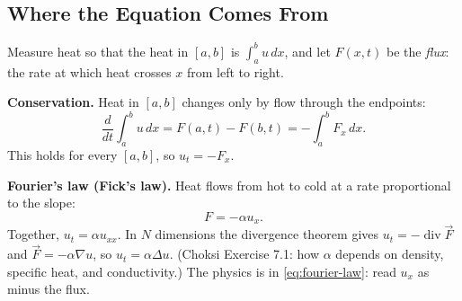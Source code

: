 \documentclass{article}
\begin{document}
\subsection{Where the Equation Comes From}
Measure heat so that the heat in $[a,b]$ is $\int_a^b u\,dx$, and let $F(x,t)$ be the \emph{flux}: the rate at which heat crosses $x$ from left to right.\par
\textbf{Conservation.} Heat in $[a,b]$ changes only by flow through the endpoints:
\begin{equation}
    \frac{d}{dt}\int_a^b u\,dx = F(a,t) - F(b,t) = -\int_a^b F_x\,dx.
\end{equation}
This holds for every $[a,b]$, so $u_t = -F_x$.\par
\textbf{Fourier's law (Fick's law).} Heat flows from hot to cold at a rate proportional to the slope:
\begin{equation}\label{eq:fourier-law}
    F = -\alpha u_x.
\end{equation}
Together, $u_t = \alpha u_{xx}$. In $N$ dimensions the divergence theorem gives $u_t = -\operatorname{div}\vec{F}$ and $\vec{F} = -\alpha\nabla u$, so $u_t = \alpha\Delta u$. (Choksi Exercise 7.1: how $\alpha$ depends on density, specific heat, and conductivity.) The physics is in \eqref{eq:fourier-law}: read $u_x$ as minus the flux.
\end{document}
